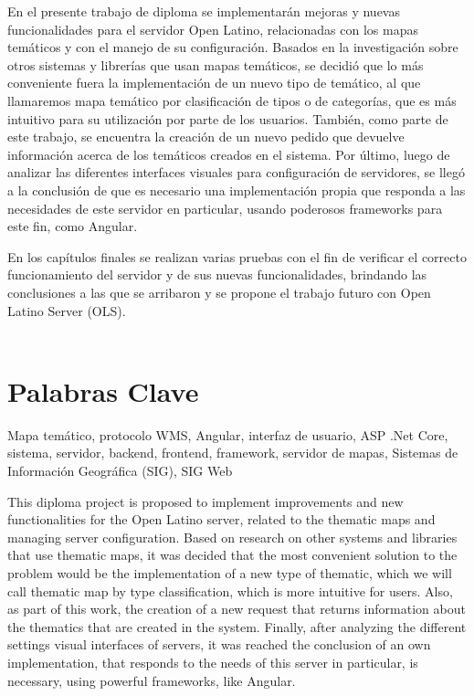 
En el presente trabajo de diploma se implementar\'an mejoras y nuevas funcionalidades para el servidor Open Latino, relacionadas con los mapas tem\'aticos y con el manejo de su configuraci\'on. Basados en la investigaci\'on sobre otros sistemas y librer\'ias que usan mapas tem\'aticos, se decidi\'o que lo m\'as conveniente fuera la implementaci\'on de un nuevo tipo de tem\'atico, al que llamaremos mapa tem\'atico por clasificaci\'on de tipos o de categor\'ias, que es m\'as intuitivo para su utilizaci\'on por parte de los usuarios. Tambi\'en, como parte de este trabajo, se encuentra la creaci\'on de un nuevo pedido que devuelve informaci\'on acerca de los tem\'aticos creados en el sistema. Por \'ultimo, luego de analizar las diferentes interfaces visuales para configuraci\'on de servidores, se lleg\'o a la conclusi\'on de que es necesario una implementaci\'on propia que responda a las necesidades de este servidor en particular, usando poderosos frameworks para este fin, como Angular.

En los cap\'itulos finales se realizan varias pruebas con el fin de verificar el correcto funcionamiento del servidor y de sus nuevas funcionalidades, brindando las conclusiones a las que se arribaron y se propone el trabajo futuro con Open Latino Server (OLS).\\\\

\section*{Palabras Clave}
Mapa tem\'atico, protocolo WMS, Angular, interfaz de usuario, ASP .Net Core, sistema, servidor, backend, frontend, framework, servidor de mapas, Sistemas de Informaci\'on Geogr\'afica (SIG), SIG Web


This diploma project is proposed to implement improvements and new functionalities for the Open Latino server, related to the thematic maps and managing server configuration. Based on research on other systems and libraries that use thematic maps, it was decided that the most convenient solution to the problem would be the implementation of a new type of thematic, which we will call thematic map by type classification, which is more intuitive for users. Also, as part of this work, the creation of a new request that returns information about the thematics that are created in the system. Finally, after analyzing the different settings visual interfaces of servers, it was reached the conclusion of an own implementation, that responds to the needs of this server in particular, is necessary, using powerful frameworks, like Angular. 

